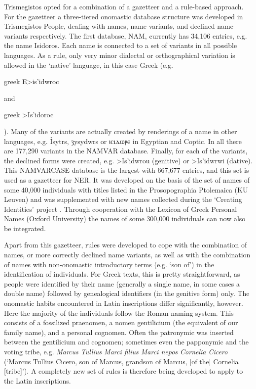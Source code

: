 \documentclass[amsthm,ebook]{saparticle}
\begin{document}
Trismegistos opted for a combination of a gazetteer and a rule-based approach. For the gazetteer a three-tiered
onomastic database structure was developed in Trismegistos People, dealing with names, name variants, and declined name
variants respectively. The first database, NAM, currently has 34,106 entries, e.g. the name Isidoros. Each name is
connected to a set of variants in all possible languages. As a rule, only very minor dialectal or orthographical
variation is allowed in the `native' language, in this case Greek (e.g. \begin{otherlanguage*}{greek}
E>is'idwroc
\end{otherlanguage*} and
\begin{otherlanguage*}{greek}
>Is'idoroc
\end{otherlanguage*}). Many of the variants are actually created by renderings of a name in other languages, e.g.
Ỉsytrs, ȝysydwrs or ⲓⲥⲓⲇⲱⲣⲉ in Egyptian and Coptic. In all there
are 177,290 variants in the NAMVAR database. Finally, for each of the variants, the declined forms were created, e.g.
\textgreek{>Is'idwrou (}genitive) or \textgreek{>Is'idwrwi (}dative). This NAMVARCASE database is the largest with
667,677 entries, and this set is used as a gazetteer for NER. It was developed on the basis of the set of names of some
40,000 individuals with titles listed in the Prosopographia Ptolemaica (KU Leuven) and was supplemented with new names
collected during the `Creating Identities' project \citep{Depauw2009}. Through cooperation with the Lexicon of
Greek Personal Names (Oxford University) the names of some 300,000 individuals can now also be integrated.

Apart from this gazetteer, rules were developed to cope with the combination of names, or more correctly declined name
variants, as well as with the combination of names with non-onomastic introductory terms (e.g. `son of') in the
identification of individuals. For Greek texts, this is pretty straightforward, as people were identified by their name
(generally a single name, in some cases a double name) followed by genealogical identifiers (in the genitive form)
only. The onomastic habits encountered in Latin inscriptions differ significantly, however. Here the majority of the
individuals follow the Roman naming system. This consists of a fossilized praenomen, a nomen gentilicium (the
equivalent of our family name), and a personal cognomen. Often the patronymic was inserted between the gentilicium and
cognomen; sometimes even the papponymic and the voting tribe, e.g. \emph{Marcus Tullius Marci filius Marci nepos Cornelia
Cicero} (`Marcus Tullius Cicero, son of Marcus, grandson of Marcus, [of the] Cornelia [tribe]'). A completely new set of
rules is therefore being developed to apply to the Latin inscriptions.
\end{document}
